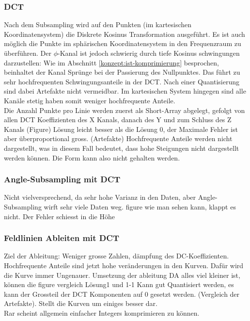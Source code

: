 \subsubsection{DCT}
Nach dem Subsampling wird auf den Punkten (im kartesischen Koordinatensystem) die Diskrete Kosinus Transformation ausgeführt. Es ist auch möglich die Punkte im sphärischen Koordinatensystem in den Frequenzraum zu überführen. Der $\phi$-Kanal ist jedoch schwierig durch tiefe Kosinus schwingungen darzustellen: Wie im Abschnitt \ref{konzept:ist-komprimierung} besprochen, beinhaltet der Kanal Sprünge bei der Passierung des Nullpunktes. Das führt zu sehr hochfrequenten Schwingungsanteile in der DCT. Nach einer Quantisierung sind dabei Artefakte nicht vermeidbar. Im kartesischen System hingegen sind alle Kanäle stetig haben somit weniger hochfrequente Anteile.\\
Die Anzahl Punkte pro Linie werden zuerst als Short-Array abgelegt, gefolgt von allen DCT Koeffizienten des X Kanals, danach des Y und zum Schluss des Z Kanals
(Figure)
Lösung leicht besser als die Lösung 0, der Maximale Fehler ist aber überproportional gross.
(Artefakte)
Hochfrequente Anteile werden nicht dargestellt, was in diesem Fall bedeutet, dass hohe Steigungen nicht dargestellt werden können. Die Form kann also nicht gehalten werden.

\subsubsection{Angle-Subsampling mit DCT}
Nicht vielversprechend, da sehr hohe Varianz in den Daten, aber Angle-Subsampling wirft sehr viele Daten weg.
figure 
wie man sehen kann, klappt es nicht. Der Fehler schiesst in die Höhe

\subsubsection{Feldlinien Ableiten mit DCT}\label{resultate:dct:ableitung_dct}
Ziel der Ableitung: Weniger grosse Zahlen, dämpfung des DC-Koeffizienten. Hochfrequente Anteile sind jetzt hohe veränderungen in den Kurven. Dafür wird die Kurve immer Ungenauer.
Umsetzung der ableitung
DA alles viel kleiner ist, können die 
figure vergleich Lösung1 und 1-1
Kann gut Quantisiert werden, es kann der Grossteil der DCT Komponenten auf 0 gesetzt werden. 
(Vergleich der Artefakte).
Stellt die Kurven um einiges besser dar.\\
[\baselineskip] Rar scheint allgemein einfacher Integers komprimieren zu können.


